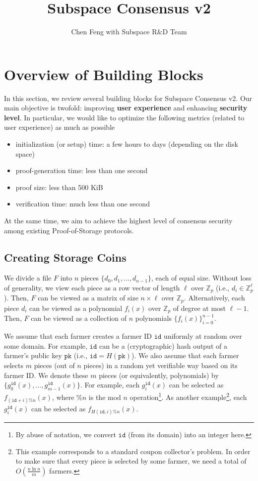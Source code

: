 \documentclass[12pt,draftcls,onecolumn]{IEEEtran}
\title{Subspace Consensus v2}
\author{Chen Feng with Subspace R\&D Team}
\newcommand{\Fp}{\mathbb{Z}_p}
\newcommand{\pk}{\texttt{pk}}
\newcommand{\id}{\texttt{id}}
\begin{document}
\maketitle


\section{Overview of Building Blocks}

In this section, we review several building blocks for Subspace Consensus v2. 
Our main objective is twofold: improving {\bf user experience} and enhancing {\bf security level}.
In particular, we would like to optimize the following metrics (related to user experience) as much as possible
\begin{itemize}
    \item initialization (or setup) time: a few hours to days (depending on the disk space)
    \item proof-generation time: less than one second
    \item proof size: less than 500 KiB
    \item verification time: much less than one second
\end{itemize}
At the same time, we aim to achieve the highest level of consensus security among existing Proof-of-Storage protocols. 

\subsection{Creating Storage Coins}

We divide a file $F$ into $n$ pieces $\{ d_0, d_1, \ldots, d_{n-1}\}$, each of equal size. 
Without loss of generality, we view each piece as a row vector of length $\ell$ over $\Fp$  (i.e., $d_i \in \Fp^\ell$).
Then, $F$ can be viewed as a matrix of size $n \times \ell$ over $\Fp$.
Alternatively, each piece $d_i$ can be viewed as a polynomial $f_i(x)$ over $\Fp$ of degree at most $\ell - 1$. 
Then, $F$ can be viewed as a collection of $n$ polynomials $\{ f_i(x) \}_{i = 0}^{n-1}$. 

We assume that each farmer creates a farmer ID $\id$ uniformly at random over some domain. For example, $\id$ can be a (cryptographic) hash output of a farmer's public key $\pk$ (i.e., $\id = H(\pk)$).
We also assume that each farmer selects $m$ pieces (out of $n$ pieces) in a random yet verifiable way based on its farmer ID.
We denote these $m$ pieces (or equivalently, polynomials) by $\{g_0^{\id}(x), \ldots, g_{m-1}^{\id}(x) \}$.
For example, each $g_i^{\id}(x)$ can be selected as $f_{(\id + i)\% n}(x)$, where $\% n$ is the mod $n$ operation\footnote{By abuse of notation, we convert $\id$ (from its domain) into an integer here.}.
As another example\footnote{This example corresponds to a standard coupon collector's problem. In order to make sure that every piece is selected by some farmer, we need a total of $O\left( \frac{n \ln n}{m} \right)$ farmers.}, each $g_i^{\id}(x)$ can be selected as $f_{H(\id, i)\% n}(x)$.
\end{document}
